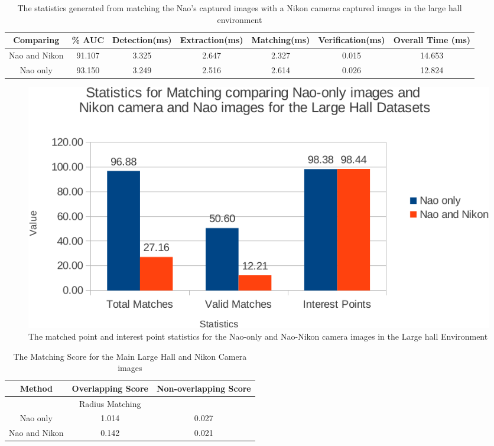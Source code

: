\documentclass[11pt]{report}
\begin{document}
\begin{table}
\caption{The statistics generated from matching the Nao's captured images with
a Nikon cameras captured images in the large hall environment}
\begin{tabular}{|c|c|c|c|c|c|c|}
\hline 
Comparing & \% AUC & Detection(ms) & Extraction(ms) & Matching(ms) & Verification(ms) & Overall Time (ms)\tabularnewline
\hline 
\hline 
Nao and Nikon & 91.107 & 3.325 & 2.647 & 2.327 & 0.015 & 14.653\tabularnewline
\hline 
Nao only & 93.150 & 3.249 & 2.516 & 2.614 & 0.026 & 12.824\tabularnewline
\hline 
\end{tabular}
\label{tab:naoNikonLargeHall}
\end{table}

\begin{figure}[h!] 
  \centering
    \includegraphics[width=1.0\textwidth]{../Drawings/Graphs/nikon_lh_matches_keypoints_best.pdf}
    \caption{The matched point and interest point statistics for the Nao-only and Nao-Nikon camera images in the Large hall Environment}
    \label{fig:nikon_lh_matches_keypoints}
\end{figure}


\begin{table}
\caption{The Matching Score for the Main Large Hall and Nikon Camera images}
\begin{tabular}{|c|c|c|}
\hline 
Method & Overlapping Score & Non-overlapping Score\tabularnewline
\hline 
\hline 
 & Radius Matching & \tabularnewline
\hline 
Nao only & 1.014 & 0.027\tabularnewline
\hline 
Nao and Nikon & 0.142 & 0.021\tabularnewline
\hline 
\end{tabular}
\label{tab:nklhMS}
\end{table}
\end{document}
